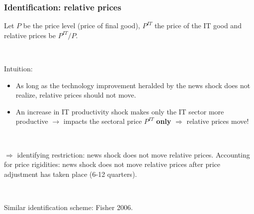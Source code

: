 \documentclass{beamer}
\begin{document}
\begin{frame}
	\frametitle{Identification: relative prices}

Let $P$ be the price level (price of final good), $P^{IT}$ the price of the IT good and relative prices be $P^{IT}/P$.

\

Intuition:
\begin{itemize}
\item As long as the technology improvement heralded by the news shock does not realize, relative prices should not move.
\item An increase in IT productivity shock makes only the IT sector more productive $\rightarrow$ impacts the sectoral price $P^{IT}$ \textbf{only} $\Rightarrow$ relative prices move! 
\end{itemize}

\

$\Rightarrow$ identifying restriction: news shock does not move relative prices.
\newline Accounting for price rigidities: news shock does not move relative prices after price adjustment has taken place (6-12 quarters).

\

Similar identification scheme: Fisher 2006.

%
%
%
%
%
%
%
%
%



\end{frame}
\end{document}
